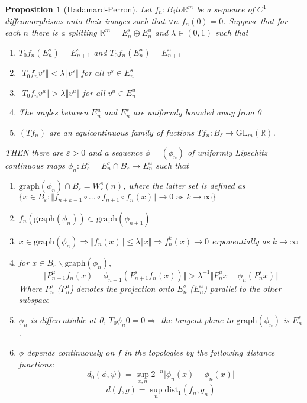 \documentclass{article}
\newtheorem{prop}{Proposition}
\begin{document}
\begin{prop}[Hadamard-Perron]

Let $f_n: B_{\delta} to \mathbb{R}^m$ be a sequence of $C^1$ diffeomorphisms onto their images such that $\forall n \hspace{4pt} f_n(0)=0$. Suppose that for each $n$ there is a splitting $\mathbb{R}^m=E^s_n \oplus E^u_n$ and $\lambda \in (0,1)$ such that

\begin{enumerate}
    \item $T_0f_n (E^s_n) = E^s_{n+1}$ and $T_0f_n(E^u_n)=E^u_{n+1}$
    \item $\Vert T_0f_n v^s \Vert < \lambda \Vert v^s \Vert$ for all $v^s \in E^s_n$
    \item $\Vert T_0f_n v^u \Vert > \lambda \Vert v^u \Vert $ for all $v^u \in E^u_n$
    \item The angles between $E^u_n$ and $E^s_n$ are uniformly bounded away from 0
    \item $(Tf_n)$ are an equicontinuous family of fuctions $Tf_n: B_{\delta} \to \mathrm{GL}_m(\mathbb{R})$.
\end{enumerate}
THEN there are $\varepsilon > 0$ and a sequence $\phi = (\phi_n)$ of uniformly Lipschitz continuous maps $\phi_n:B^s_{\varepsilon} = E^s_n \cap B_{\varepsilon} \to E^u_n$ such that

\begin{enumerate}
    \item $\mathrm{graph}(\phi_n) \cap B_{\varepsilon} = W^s_{\varepsilon}(n)$, where the latter set is defined as $\{ x \in B_{\varepsilon}: \Vert f_{n+k-1} \circ ... \circ f_{n+1} \circ f_n(x) \Vert \to 0 \text{ as } k \to \infty \}$
    \item $f_n(\mathrm{graph}(\phi_n)) \subset \mathrm{graph}(\phi_{n+1})$
    \item $x \in \mathrm{graph}(\phi_n) \Rightarrow \Vert f_n(x) \Vert \leq \lambda \Vert x \Vert \Rightarrow f^k_n(x) \to 0$ exponentially as $k \to \infty$
    \item for $x \in B_{\varepsilon} \backslash \mathrm{graph}(\phi_n),$
    \[
    \Vert P^u_{n+1} f_n(x) - \phi_{n+1} \left( P^s_{n+1} f_n(x) \right) \Vert > \lambda^{-1} \Vert P^u_nx - \phi_n \left( P^s_nx \right) \Vert
    \]
    Where $P^s_n$ ($P^u_n$) denotes the projection onto $E^s_n$ ($E^u_n$) parallel to the other subspace
    \item $\phi_n$ is differentiable at 0, $T_0\phi_n 0 = 0 \Rightarrow$ the tangent plane to $\mathrm{graph}(\phi_n)$ is $E^s_n$.
    \item $\phi$ depends continuously on $f$ in the topologies by the following distance functions:
    \[d_0(\phi,\psi) = \sup_{x,n} 2^{-n} \vert \phi_n(x) - \phi_n(x) \vert\]
    \[d(f,g) = \sup_{n} \mathrm{dist}_1(f_n, g_n)\]
    
\end{enumerate}
\end{prop}
\end{document}

